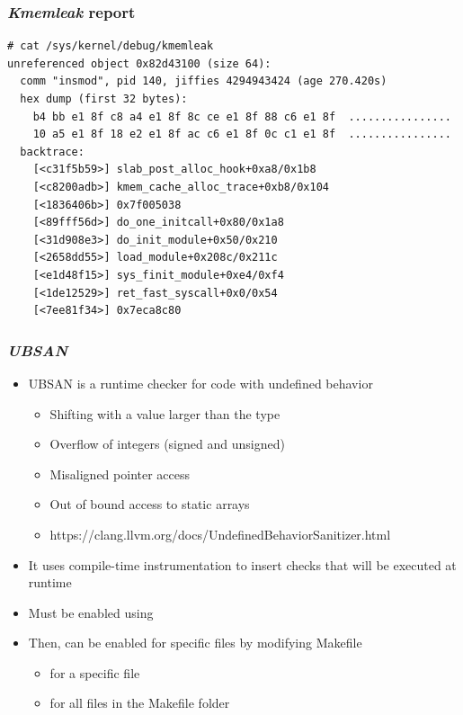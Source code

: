 \begin{frame}[fragile]
  \frametitle{{\em Kmemleak} report}
  \begin{block}{}
    \begin{verbatim}
# cat /sys/kernel/debug/kmemleak
unreferenced object 0x82d43100 (size 64):
  comm "insmod", pid 140, jiffies 4294943424 (age 270.420s)
  hex dump (first 32 bytes):
    b4 bb e1 8f c8 a4 e1 8f 8c ce e1 8f 88 c6 e1 8f  ................
    10 a5 e1 8f 18 e2 e1 8f ac c6 e1 8f 0c c1 e1 8f  ................
  backtrace:
    [<c31f5b59>] slab_post_alloc_hook+0xa8/0x1b8
    [<c8200adb>] kmem_cache_alloc_trace+0xb8/0x104
    [<1836406b>] 0x7f005038
    [<89fff56d>] do_one_initcall+0x80/0x1a8
    [<31d908e3>] do_init_module+0x50/0x210
    [<2658dd55>] load_module+0x208c/0x211c
    [<e1d48f15>] sys_finit_module+0xe4/0xf4
    [<1de12529>] ret_fast_syscall+0x0/0x54
    [<7ee81f34>] 0x7eca8c80
    \end{verbatim}
  \end{block}
\end{frame}

\begin{frame}
  \frametitle{{\em UBSAN}}
  \begin{itemize}
    \item UBSAN is a runtime checker for code with undefined behavior
    \begin{itemize}
      \item Shifting with a value larger than the type
      \item Overflow of integers (signed and unsigned)
      \item Misaligned pointer access
      \item Out of bound access to static arrays
      \item https://clang.llvm.org/docs/UndefinedBehaviorSanitizer.html
    \end{itemize}
    \item It uses compile-time instrumentation to insert checks that will be
          executed at runtime
    \item Must be enabled using 
    \item Then, can be enabled for specific files by modifying Makefile
    \begin{itemize}
      \item {} for a specific file
      \item {} for all files in the Makefile folder
    \end{itemize}
  \end{itemize}
\end{frame}

